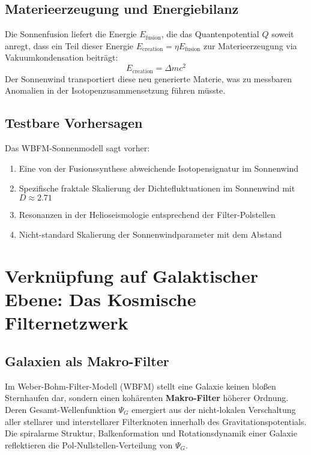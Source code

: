 \subsection{Materieerzeugung und Energiebilanz}

Die Sonnenfusion liefert die Energie \(E_{\text{fusion}}\), die das Quantenpotential \(Q\) soweit anregt, dass ein Teil dieser Energie \(E_{\text{creation}} = \eta E_{\text{fusion}}\) zur Materieerzeugung via Vakuumkondensation beiträgt:
\[
E_{\text{creation}} = \Delta m c^2
\]
Der Sonnenwind transportiert diese neu generierte Materie, was zu messbaren Anomalien in der Isotopenzusammensetzung führen müsste.

\subsection{Testbare Vorhersagen}

Das WBFM-Sonnenmodell sagt vorher:
\begin{enumerate}
\item Eine von der Fusionssynthese abweichende Isotopensignatur im Sonnenwind
\item Spezifische fraktale Skalierung der Dichtefluktuationen im Sonnenwind mit \(D \approx 2.71\)
\item Resonanzen in der Helioseismologie entsprechend der Filter-Polstellen
\item Nicht-standard Skalierung der Sonnenwindparameter mit dem Abstand
\end{enumerate}

\section{Verknüpfung auf Galaktischer Ebene: Das Kosmische Filternetzwerk}

\subsection{Galaxien als Makro-Filter}

Im Weber-Bohm-Filter-Modell (WBFM) stellt eine Galaxie keinen bloßen Sternhaufen dar, sondern einen kohärenten \textbf{Makro-Filter} höherer Ordnung. Deren Gesamt-Wellenfunktion \(\Psi_G\) emergiert aus der nicht-lokalen Verschaltung aller stellarer und interstellarer Filterknoten innerhalb des Gravitationspotentials. Die spiralarme Struktur, Balkenformation und Rotationsdynamik einer Galaxie reflektieren die Pol-Nullstellen-Verteilung von \(\Psi_G\).

